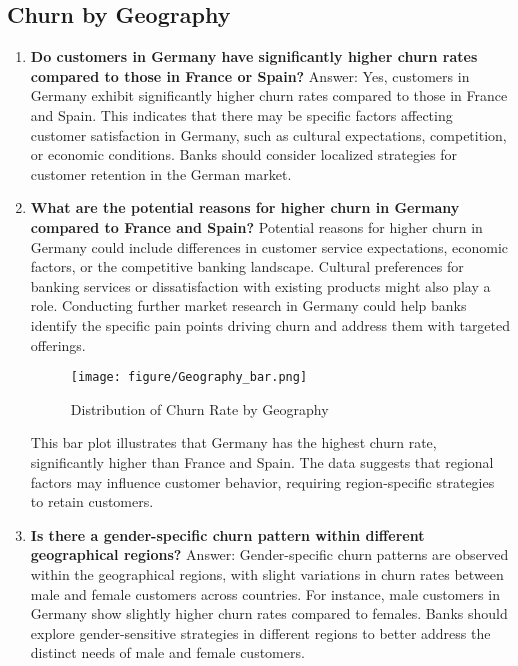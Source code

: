 \documentclass[12pt]{article}
\begin{document}
\subsection{Churn by Geography}
\begin{enumerate}
    \item \textbf{Do customers in Germany have significantly higher churn rates compared to those in France or Spain?}
    Answer: Yes, customers in Germany exhibit significantly higher churn rates compared to those in France and Spain. This indicates that there may be specific factors affecting customer satisfaction in Germany, such as cultural expectations, competition, or economic conditions. Banks should consider localized strategies for customer retention in the German market.

    \item \textbf{What are the potential reasons for higher churn in Germany compared to France and Spain?}
    Potential reasons for higher churn in Germany could include differences in customer service expectations, economic factors, or the competitive banking landscape. Cultural preferences for banking services or dissatisfaction with existing products might also play a role. Conducting further market research in Germany could help banks identify the specific pain points driving churn and address them with targeted offerings.

    \begin{figure}[h]
        \vspace{5pt}
        \centering
        \texttt{[image: figure/Geography\_bar.png]}  
        \caption{Distribution of Churn Rate by Geography}
            \label{fig:geographydistribution}
       \vspace{0.1cm}
    \end{figure}
    
    This bar plot illustrates that Germany has the highest churn rate, significantly higher than France and Spain. The data suggests that regional factors may influence customer behavior, requiring region-specific strategies to retain customers.

 \newpage
    \item \textbf{ Is there a gender-specific churn pattern within different geographical regions?}
    Answer: Gender-specific churn patterns are observed within the geographical regions, with slight variations in churn rates between male and female customers across countries. For instance, male customers in Germany show slightly higher churn rates compared to females. Banks should explore gender-sensitive strategies in different regions to better address the distinct needs of male and female customers.


\end{enumerate}
\end{document}

